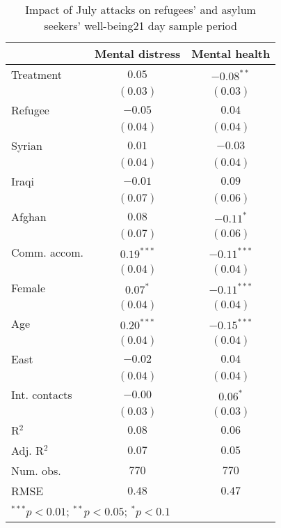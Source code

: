 
\begin{table}
\caption{Impact of July attacks on refugees' and asylum seekers' well-being21 day sample period}
\begin{center}
\begin{tabular}{l c c}
\toprule
 & Mental distress & Mental health \\
\midrule
Treatment     & $0.05$       & $-0.08^{**}$  \\
              & $(0.03)$     & $(0.03)$      \\
Refugee       & $-0.05$      & $0.04$        \\
              & $(0.04)$     & $(0.04)$      \\
Syrian        & $0.01$       & $-0.03$       \\
              & $(0.04)$     & $(0.04)$      \\
Iraqi         & $-0.01$      & $0.09$        \\
              & $(0.07)$     & $(0.06)$      \\
Afghan        & $0.08$       & $-0.11^{*}$   \\
              & $(0.07)$     & $(0.06)$      \\
Comm. accom.  & $0.19^{***}$ & $-0.11^{***}$ \\
              & $(0.04)$     & $(0.04)$      \\
Female        & $0.07^{*}$   & $-0.11^{***}$ \\
              & $(0.04)$     & $(0.04)$      \\
Age           & $0.20^{***}$ & $-0.15^{***}$ \\
              & $(0.04)$     & $(0.04)$      \\
East          & $-0.02$      & $0.04$        \\
              & $(0.04)$     & $(0.04)$      \\
Int. contacts & $-0.00$      & $0.06^{*}$    \\
              & $(0.03)$     & $(0.03)$      \\
\midrule
R$^2$         & $0.08$       & $0.06$        \\
Adj. R$^2$    & $0.07$       & $0.05$        \\
Num. obs.     & $770$        & $770$         \\
RMSE          & $0.48$       & $0.47$        \\
\bottomrule
\multicolumn{3}{l}{\scriptsize{$^{***}p<0.01$; $^{**}p<0.05$; $^{*}p<0.1$}}
\end{tabular}
\label{tab_mhealth_z_mcs}
\end{center}
\end{table}
